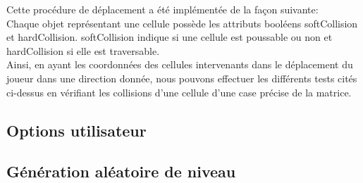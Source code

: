 \documentclass[../main.tex]{subfiles}
\begin{document}
Cette procédure de déplacement a été implémentée de la façon suivante: \\
Chaque objet représentant une cellule possède les attributs booléens softCollision et hardCollision.
softCollision indique si une cellule est poussable ou non et hardCollision si elle est traversable.\\
Ainsi, en ayant les coordonnées des cellules intervenants dans le déplacement du joueur dans une direction donnée, nous pouvons effectuer les différents tests cités ci-dessus en vérifiant les collisions d'une cellule d'une case précise de la matrice.

\subsection{Options utilisateur}

\subsection{Génération aléatoire de niveau}
\end{document}
